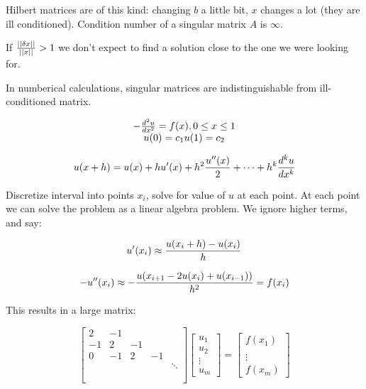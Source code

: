 Hilbert matrices are of this kind: changing $b$ a little bit, $x$ changes a lot (they are ill conditioned). Condition number of a singular matrix $A$ is $\infty$.

If ${\left|\left|\delta x\right|\right| \over \left|\left|x\right|\right|} > 1$ we don't expect to find a solution close to the one we were looking for.

In numberical calculations, singular matrices are indistinguishable from ill-conditioned matrix.


\[
	\begin{matrix}
		-{d^2 u \over dx^2} = f(x), 0 \leq x \leq 1 \\
		u(0) = c_1
		u(1) = c_2
	\end{matrix}
\]

\[
	u(x+h) = u(x) + h u'(x) + h^2 {u''(x) \over 2} + \dots + h^k {d^k u \over d x^k}
\]

Discretize interval into points $x_i$, solve for value of $u$ at each point. At each point we can solve the problem as a linear algebra problem. We ignore higher terms, and say:

\[
	u'(x_i) \approx {u(x_i+h) - u(x_i) \over h}
\]

\[
	-u''(x_i) \approx -{u(x_{i+1} - 2 u(x_i) + u(x_{i-1})) \over h^2 } = f(x_i)
\]

This results in a large matrix:

\[
	\begin{bmatrix}
		2 & -1 \\
		-1 & 2 & -1 \\
		0 & -1 & 2 & -1 \\
		 & & & & \ddots \\ \\ \\
	\end{bmatrix}
	\begin{bmatrix}
		u_1 \\ u_2 \\ \vdots \\ u_m
	\end{bmatrix}
	=
	\begin{bmatrix}
		f(x_1) \\ \\ \vdots \\ f(x_m)
	\end{bmatrix}
\]
